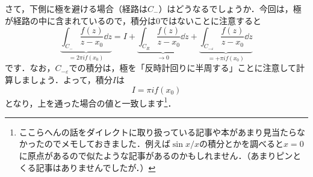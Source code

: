 \documentclass[a4paper,pdflatex,ja=standard]{bxjsarticle}
\begin{document}
\begin{itemize}
  さて，下側に極を避ける場合（経路は$C_{-}$）はどうなるでしょうか．今回は，極が経路の中に含まれているので，積分は0ではないことに注意すると
  \begin{equation}
    \underbrace{
      \int_{C_{-}}
      \frac{f(z)}{z-x_0}
      \dd z      
    }_{=2\pi if(x_0)}
    =
    I
    +
    \underbrace{
      \int_{C_{R}}
      \frac{f(z)}{z-x_0}
      \dd z
    }_{\rightarrow0}
    +
    \underbrace{
      \int_{C_{-\varepsilon}}
      \frac{f(z)}{z-x_0}
      \dd z
    }_{=+\pi if(x_0)}
  \end{equation}
  です．なお，$C_{-\varepsilon}$での積分は，極を「反時計回りに半周する」ことに注意して計算しましょう．よって，積分$I$は
  \begin{equation}
    I
    =
    \pi if(x_0)
  \end{equation}
  となり，上を通った場合の値と一致します\footnote{
    ここらへんの話をダイレクトに取り扱っている記事や本があまり見当たらなかったのでメモしておきました．例えば$\sin x/x$の積分とかを調べると$x=0$に原点があるので似たような記事があるのかもしれません．（あまりピンとくる記事はありませんでしたが．）
  }．


\end{itemize}
\end{document}
